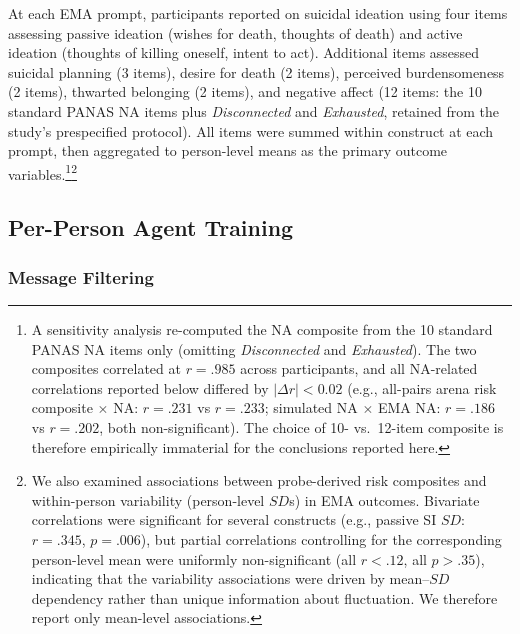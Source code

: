 \documentclass[review,12pt,authoryear]{elsarticle}
\begin{document}
At each EMA prompt, participants reported on suicidal ideation using four items assessing passive ideation (wishes for death, thoughts of death) and active ideation (thoughts of killing oneself, intent to act). Additional items assessed suicidal planning (3 items), desire for death (2 items), perceived burdensomeness (2 items), thwarted belonging (2 items), and negative affect (12 items: the 10 standard PANAS NA items plus \textit{Disconnected} and \textit{Exhausted}, retained from the study's prespecified protocol). All items were summed within construct at each prompt, then aggregated to person-level means as the primary outcome variables.\footnote{A sensitivity analysis re-computed the NA composite from the 10 standard PANAS NA items only (omitting \textit{Disconnected} and \textit{Exhausted}). The two composites correlated at $r = .985$ across participants, and all NA-related correlations reported below differed by $|\Delta r| < 0.02$ (e.g., all-pairs arena risk composite $\times$ NA: $r = .231$ vs $r = .233$; simulated NA $\times$ EMA NA: $r = .186$ vs $r = .202$, both non-significant). The choice of 10- vs.\ 12-item composite is therefore empirically immaterial for the conclusions reported here.}\footnote{We also examined associations between probe-derived risk composites and within-person variability (person-level $SD$s) in EMA outcomes. Bivariate correlations were significant for several constructs (e.g., passive SI $SD$: $r = .345$, $p = .006$), but partial correlations controlling for the corresponding person-level mean were uniformly non-significant (all $r < .12$, all $p > .35$), indicating that the variability associations were driven by mean--$SD$ dependency rather than unique information about fluctuation. We therefore report only mean-level associations.}

\subsection{Per-Person Agent Training}

\subsubsection{Message Filtering}
\end{document}
